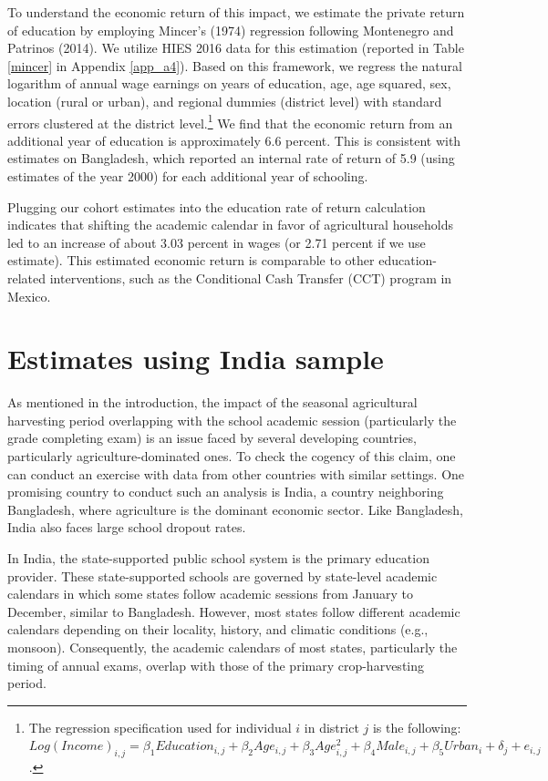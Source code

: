 \documentclass[12pt,letterpaper]{article}
\newcommand{\0}{\ensuremath{\mbox{\boldmath $0$}}}
\begin{document}
To understand the economic return of this impact, we estimate the private return of education by employing Mincer's (1974) regression following Montenegro and Patrinos (2014). We utilize HIES 2016 data for this estimation (reported in Table \ref{mincer} in Appendix \ref{app_a4}). Based on this framework, we regress the natural logarithm of annual wage earnings on years of education, age, age squared, sex, location (rural or urban), and regional dummies (district level) with standard errors clustered at the district level.\footnote{The regression specification used for individual $i$ in district $j$ is the following: $Log(Income)_{i,j}=\beta_{1}Education_{i,j}+\beta_{2}Age_{i,j}+\beta_{3}Age^{2}_{i,j}+\beta_{4}Male_{i,j}+\beta_{5}Urban_{i}+\delta_{j}+e_{i,j}$.}
We find that the economic return from an additional year of education is approximately 6.6 percent. This is consistent with \cite{montenegro2014comparable} estimates on Bangladesh, which reported an internal rate of return of 5.9 (using estimates of the year 2000) for each additional year of schooling. 

Plugging our cohort estimates into the education rate of return calculation indicates that shifting the academic calendar in favor of agricultural households led to an increase of about 3.03 percent in wages (or 2.71 percent if we use \cite{montenegro2014comparable} estimate). This estimated economic return is comparable to other education-related interventions, such as the Conditional Cash Transfer (CCT) program in Mexico.


\section{Estimates using India sample}

As mentioned in the introduction, the impact of the seasonal agricultural harvesting period overlapping with the school academic session (particularly the grade completing exam) is an issue faced by several developing countries, particularly agriculture-dominated ones. To check the cogency of this claim, one can conduct an exercise with data from other countries with similar settings. One promising country to conduct such an analysis is India, a country neighboring Bangladesh, where agriculture is the dominant economic sector. Like Bangladesh, India also faces large school dropout rates.

In India, the state-supported public school system is the primary education provider. These state-supported schools are governed by state-level academic calendars in which some states follow academic sessions from January to December, similar to Bangladesh. However, most states follow different academic calendars depending on their locality, history, and climatic conditions (e.g., monsoon). Consequently, the academic calendars of most states, particularly the timing of annual exams, overlap with those of the primary crop-harvesting period. 
\end{document}
